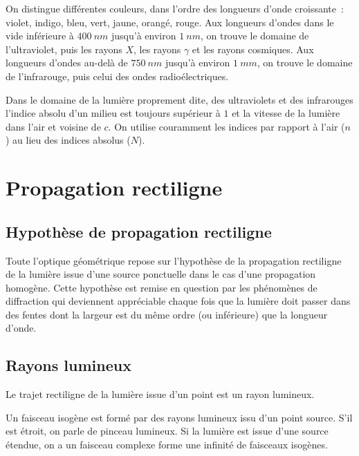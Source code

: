 On distingue différentes couleurs, dans l'ordre des longueurs d'onde croissante~: violet, indigo, bleu, vert, jaune, orangé, rouge. Aux longueurs d'ondes dans le vide inférieure à $\SI{400}{nm}$ jusqu'à environ $\SI{1}{nm}$, on trouve le domaine de l'ultraviolet, puis les rayons $X$, les rayons $\gamma$ et les rayons cosmiques. Aux longueurs d'ondes au-delà de $\SI{750}{nm}$ jusqu'à environ $\SI{1}{mm}$, on trouve le domaine de l'infrarouge, puis celui des ondes radioélectriques.

Dans le domaine de la lumière proprement dite, des ultraviolets et des infrarouges l'indice absolu d'un milieu est toujours supérieur à $1$ et la vitesse de la lumière dans l'air et voisine de $c$. On utilise couramment les indices par rapport à l'air ($n$) au lieu des indices absolus ($N$). 

\section{Propagation rectiligne}
\label{chap6-sec:propagationrectiligne}

\subsection{Hypothèse de propagation rectiligne}
\label{chap6-subsec:hypothesedepropagationrectiligne}

Toute l'optique géométrique repose sur l'hypothèse de la propagation rectiligne de la lumière issue d'une source ponctuelle dans le cas d'une propagation homogène. Cette hypothèse est remise en question par les phénomènes de diffraction qui deviennent appréciable chaque fois que la lumière doit passer dans des fentes dont la largeur est du même ordre (ou inférieure) que la longueur d'onde.

\subsection{Rayons lumineux}
\label{chap6-subsec:rayonslumineux}

\begin{defdef}
 Le trajet rectiligne de la lumière issue d'un point est un rayon lumineux.
\end{defdef}

Un faisceau isogène est formé par des rayons lumineux issu d'un point source. S'il est étroit, on parle de pinceau lumineux. Si la lumière est issue d'une source étendue, on a un faisceau complexe forme une infinité de faisceaux isogènes.

